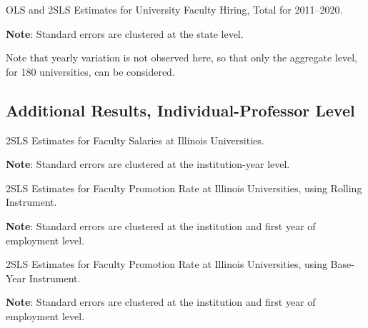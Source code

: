 \begin{table}[h!]
    \singlespacing
    \centering
    \caption{OLS and 2SLS Estimates for University Faculty Hiring, Total for 2011--2020.}
    \makebox[\textwidth][c]{}
    \begin{flushleft}
        \footnotesize
        \textbf{Note}: Standard errors are clustered at the state level.
    \end{flushleft}
    \label{tab:hiring-shock-reg}
\end{table}

Note that yearly variation is not observed here, so that only the aggregate level, for 180 universities, can be considered.


\subsection{Additional Results, Individual-Professor Level}

\begin{table}[H]
    \singlespacing
    \centering
    \caption{2SLS Estimates for Faculty Salaries at Illinois Universities.}
    \makebox[\textwidth][c]{}
    \begin{flushleft}
        \footnotesize
        \textbf{Note}: Standard errors are clustered at the institution-year level.
    \end{flushleft}
    \label{tab:facultysalaries-shock-illinois}
\end{table}

\begin{table}[H]
    \singlespacing
    \centering
    \caption{2SLS Estimates for Faculty Promotion Rate at Illinois Universities, using Rolling Instrument.}
    \makebox[\textwidth][c]{}
    \begin{flushleft}
        \footnotesize
        \textbf{Note}: Standard errors are clustered at the institution and first year of employment level.
    \end{flushleft}
    \label{tab:promotion-shock-illinois-rolling}
\end{table}

\begin{table}[H]
    \singlespacing
    \centering
    \caption{2SLS Estimates for Faculty Promotion Rate at Illinois Universities, using Base-Year Instrument.}
    \makebox[\textwidth][c]{}
    \begin{flushleft}
        \footnotesize
        \textbf{Note}: Standard errors are clustered at the institution and first year of employment level.
    \end{flushleft}
    \label{tab:promotion-shock-illinois}
\end{table}

